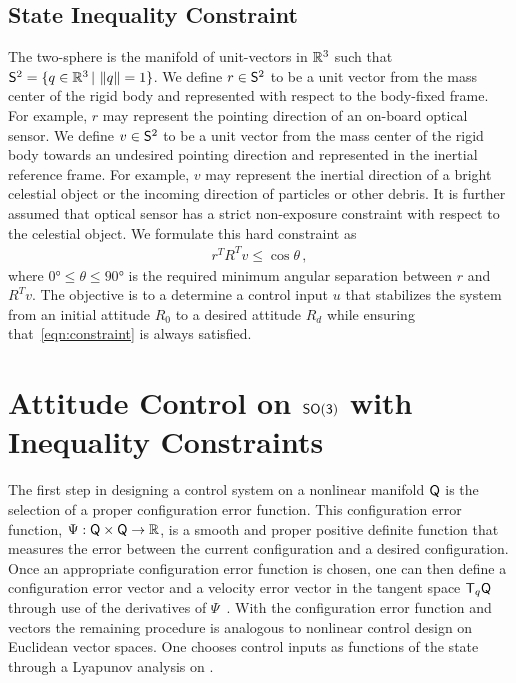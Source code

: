 \documentclass[letterpaper, 10 pt, conference]{ieeeconf}  %
\begin{document}
\subsection{State Inequality Constraint}

The two-sphere is the manifold of unit-vectors in \( \mathbb{R}^3 \) such that \( \mathsf{S}^2 = \{ q \in \mathbb{R}^3 \,  \vert \, \left\| q \right\| = 1 \}\).
We define \( r \in \mathsf{S}^2 \) to be a unit vector from the mass center of the rigid body and represented with respect to the body-fixed frame.
For example, \( r \) may represent the pointing direction of an on-board optical sensor.
We define \( v \in \mathsf{S}^2 \) to be a unit vector from the mass center of the rigid body towards an undesired pointing direction and represented in the inertial reference frame.
For example, \( v \) may represent the inertial direction of a bright celestial object or the incoming direction of particles or other debris.
It is further assumed that optical sensor has a strict non-exposure constraint with respect to the celestial object.
We formulate this hard constraint as
\begin{align}
	r^T R^T v \leq \cos \theta \, , \label{eqn:constraint}
\end{align}
where \( \ang{0} \leq \theta \leq \ang{90}  \) is the required minimum angular separation between \( r \) and \( R^T v \). 
The objective is to a determine a control input \( u \) that stabilizes the system from an initial attitude \( R_0 \) to a desired attitude \( R_d \) while ensuring that~\cref{eqn:constraint} is always satisfied.

\section{Attitude Control on $\mathsf{SO(3)}$ with Inequality Constraints}
The first step in designing a control system on a nonlinear manifold \( \mathsf{Q} \) is the selection of a proper configuration error function.
This configuration error function, \( \Psi : \mathsf{Q} \times \mathsf{Q} \to \mathbb{R} \), is a smooth and proper positive definite function that measures the error between the current configuration and a desired configuration.
Once an appropriate configuration error function is chosen, one can then define a configuration error vector and a velocity error vector in the tangent space \( \mathsf{T}_q \mathsf{Q} \) through use of the derivatives of \( \Psi \)~\cite{bullo2004}.
With the configuration error function and vectors the remaining procedure is analogous to nonlinear control design on Euclidean vector spaces.
One chooses control inputs as functions of the state through a Lyapunov analysis on \Q.
\end{document}
